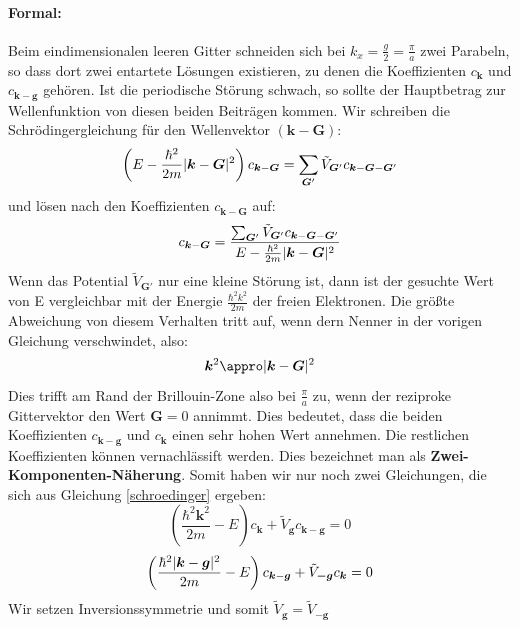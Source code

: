 \documentclass[11pt]{article}
\DeclarePairedDelimiter\abs{\lvert}{\rvert}
\begin{document}
\paragraph{Formal:} \noindent
Beim eindimensionalen leeren Gitter schneiden sich bei $k_x=\frac{g}{2}=
\frac{\pi}{a}$ zwei Parabeln, so dass dort zwei entartete Lösungen existieren,
zu denen die Koeffizienten $c_{\bm{k}}$ und $c_{\bm{k}-\bm{g}}$ gehören. Ist
die periodische Störung schwach, so sollte der Hauptbetrag zur Wellenfunktion
von diesen beiden Beiträgen kommen. Wir schreiben die Schrödingergleichung für
den Wellenvektor $(\bm{k}-\bm{G})$:
\begin{equation}\label{schroedinger}
  \left(E-\frac{\hbar^2}{2m}\abs{\bm{k}-\bm{G}}^2\right)c_{\bm{k}-\bm{G}}=
  \sum_{\bm{G}'}\tilde{V}_{\bm{G}'}c_{\bm{k}-\bm{G}-\bm{G}'}
\end{equation}
und lösen nach den Koeffizienten $c_{\bm{k}-\bm{G}}$ auf:
\begin{equation}
  c_{\bm{k}-\bm{G}}=\frac{\sum_{\bm{G}'}\tilde{V}_{\bm{G}'}
  c_{\bm{k}-\bm{G}-\bm{G}'}}{E-\frac{\hbar^2}{2m}\abs{\bm{k}-\bm{G}}^2}
\end{equation}
Wenn das Potential $\tilde{V}_{\bm{G}'}$ nur eine kleine Störung ist, dann ist
der gesuchte Wert von E vergleichbar mit der Energie $\frac{\hbar^2k^2}{2m}$ der
freien Elektronen. Die größte Abweichung von diesem Verhalten tritt auf, wenn
dern Nenner in der vorigen Gleichung verschwindet, also:
\begin{equation}
  \bm{k}^2\appro\abs{\bm{k}-\bm{G}}^2
\end{equation}
Dies trifft am Rand der Brillouin-Zone also bei $\frac{\pi}{a}$ zu, wenn der
reziproke Gittervektor den Wert $\bm{G}=0$ annimmt. Dies bedeutet, dass die
beiden Koeffizienten $c_{\bm{k}-\bm{g}}$ und $c_{\bm{k}}$ einen sehr hohen Wert
annehmen. Die restlichen Koeffizienten können vernachlässift werden. Dies
bezeichnet man als \textbf{Zwei-Komponenten-Näherung}. Somit haben wir nur noch
zwei Gleichungen, die sich aus Gleichung \ref{schroedinger} ergeben:
\begin{equation}\label{schroedinger1}
  \left(\frac{\hbar^2\bm{k}^2}{2m}-E\right)c_{\bm{k}}+\tilde{V}_{\bm{g}}
  c_{\bm{k}-\bm{g}}=0
\end{equation}
\begin{equation}\label{schroedinger2}
  \left(\frac{\hbar^2\abs{\bm{k}-\bm{g}}^2}{2m}-E\right)c_{\bm{k}-\bm{g}}+
  \tilde{V}_{\bm{-g}}c_{\bm{k}}=0
\end{equation}
Wir setzen Inversionssymmetrie und somit $\tilde{V}_{\bm{g}}=\tilde{V}_{\bm{-g}}$
\end{document}
